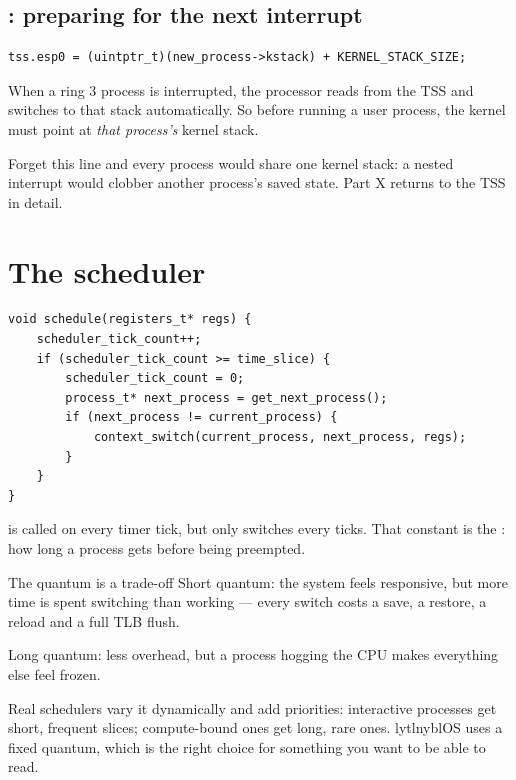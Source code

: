 \subsection{: preparing for the next interrupt}

\begin{lstlisting}[style=c]
tss.esp0 = (uintptr_t)(new_process->kstack) + KERNEL_STACK_SIZE;
\end{lstlisting}

When a ring 3 process is interrupted, the processor reads  from the TSS and switches to
that stack automatically. So before running a user process, the kernel must point  at
\emph{that process's} kernel stack.

Forget this line and every process would share one kernel stack: a nested interrupt would clobber
another process's saved state. Part X returns to the TSS in detail.

\section{The scheduler}

\begin{lstlisting}[style=c]
void schedule(registers_t* regs) {
    scheduler_tick_count++;
    if (scheduler_tick_count >= time_slice) {
        scheduler_tick_count = 0;
        process_t* next_process = get_next_process();
        if (next_process != current_process) {
            context_switch(current_process, next_process, regs);
        }
    }
}
\end{lstlisting}

 is called on every timer tick, but only switches every  ticks. That
constant is the : how long a process gets before being preempted.

\begin{concept}{The quantum is a trade-off}
Short quantum: the system feels responsive, but more time is spent switching than working --- every
switch costs a save, a restore, a  reload and a full TLB flush.

Long quantum: less overhead, but a process hogging the CPU makes everything else feel frozen.

Real schedulers vary it dynamically and add priorities: interactive processes get short, frequent
slices; compute-bound ones get long, rare ones. lytlnyblOS uses a fixed quantum, which is the right
choice for something you want to be able to read.
\end{concept}

